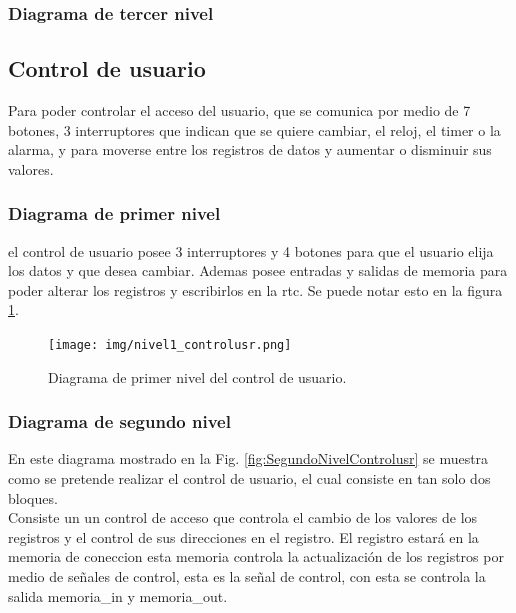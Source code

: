 \documentclass[12pt,a4paper]{article}
\begin{document}
\subsubsection{Diagrama de tercer nivel}


\subsection{Control de usuario}
Para poder controlar el acceso del usuario, que se comunica por medio de 7 botones, 3 interruptores que indican que se quiere cambiar, el reloj, el timer o la alarma, y para moverse entre los registros de datos y aumentar o disminuir sus valores.\\ 

\subsubsection{Diagrama de primer nivel}
el control de usuario posee 3 interruptores y 4 botones para que el usuario elija los datos y que desea cambiar. Ademas posee entradas y salidas de memoria para poder alterar los registros y escribirlos en la rtc. Se puede notar esto en la figura \ref{fig:PrimerNivelcontrolusr}.

\begin{figure}[htbp]
  \centering
    \texttt{[image: img/nivel1\_controlusr.png]}
  \caption[1erNivel]{Diagrama de primer nivel del control de usuario.}
  \label{fig:PrimerNivelcontrolusr}
\end{figure}

\subsubsection{Diagrama de segundo nivel}
En este diagrama mostrado en la Fig. \ref{fig:SegundoNivelControlusr} se muestra como se pretende realizar el control de usuario, el cual consiste en tan solo dos bloques.\\[2ex]

Consiste un un control de acceso que controla el cambio de los valores de los registros y el control de sus direcciones en el registro. El registro estará en la memoria de coneccion esta memoria controla la actualización de los registros por medio de señales de control, esta es la señal de control, con esta se controla la salida memoria_in y memoria_out. \\[2ex]
\end{document}
